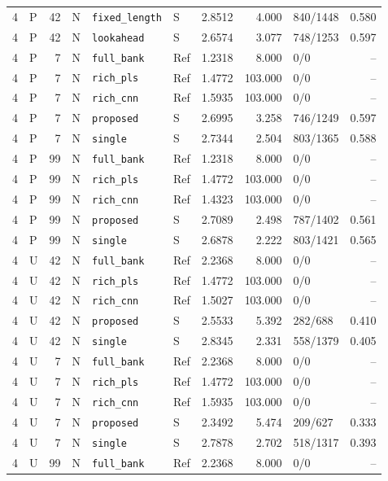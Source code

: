 \documentclass[10pt,a4paper]{article}
\begin{document}
\begin{landscape}
\begin{longtable}{rlrlllrrlr}
4 & P & 42 & N & \texttt{fixed\_length} & S & 2.8512 & 4.000 & 840/1448 & 0.580 \\
4 & P & 42 & N & \texttt{lookahead} & S & 2.6574 & 3.077 & 748/1253 & 0.597 \\
4 & P & 7 & N & \texttt{full\_bank} & Ref & 1.2318 & 8.000 & 0/0 & -- \\
4 & P & 7 & N & \texttt{rich\_pls} & Ref & 1.4772 & 103.000 & 0/0 & -- \\
4 & P & 7 & N & \texttt{rich\_cnn} & Ref & 1.5935 & 103.000 & 0/0 & -- \\
4 & P & 7 & N & \texttt{proposed} & S & 2.6995 & 3.258 & 746/1249 & 0.597 \\
4 & P & 7 & N & \texttt{single} & S & 2.7344 & 2.504 & 803/1365 & 0.588 \\
4 & P & 99 & N & \texttt{full\_bank} & Ref & 1.2318 & 8.000 & 0/0 & -- \\
4 & P & 99 & N & \texttt{rich\_pls} & Ref & 1.4772 & 103.000 & 0/0 & -- \\
4 & P & 99 & N & \texttt{rich\_cnn} & Ref & 1.4323 & 103.000 & 0/0 & -- \\
4 & P & 99 & N & \texttt{proposed} & S & 2.7089 & 2.498 & 787/1402 & 0.561 \\
4 & P & 99 & N & \texttt{single} & S & 2.6878 & 2.222 & 803/1421 & 0.565 \\
4 & U & 42 & N & \texttt{full\_bank} & Ref & 2.2368 & 8.000 & 0/0 & -- \\
4 & U & 42 & N & \texttt{rich\_pls} & Ref & 1.4772 & 103.000 & 0/0 & -- \\
4 & U & 42 & N & \texttt{rich\_cnn} & Ref & 1.5027 & 103.000 & 0/0 & -- \\
4 & U & 42 & N & \texttt{proposed} & S & 2.5533 & 5.392 & 282/688 & 0.410 \\
4 & U & 42 & N & \texttt{single} & S & 2.8345 & 2.331 & 558/1379 & 0.405 \\
4 & U & 7 & N & \texttt{full\_bank} & Ref & 2.2368 & 8.000 & 0/0 & -- \\
4 & U & 7 & N & \texttt{rich\_pls} & Ref & 1.4772 & 103.000 & 0/0 & -- \\
4 & U & 7 & N & \texttt{rich\_cnn} & Ref & 1.5935 & 103.000 & 0/0 & -- \\
4 & U & 7 & N & \texttt{proposed} & S & 2.3492 & 5.474 & 209/627 & 0.333 \\
4 & U & 7 & N & \texttt{single} & S & 2.7878 & 2.702 & 518/1317 & 0.393 \\
4 & U & 99 & N & \texttt{full\_bank} & Ref & 2.2368 & 8.000 & 0/0 & -- \\

\end{longtable}
\end{landscape}
\end{document}
